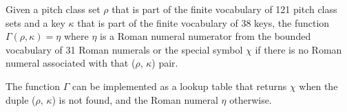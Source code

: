 
Given a pitch class set $\rho$ that is part of the finite
vocabulary of 121 pitch class sets and a key $\kappa$ that
is part of the finite vocabulary of 38 keys, the function
$\Gamma(\rho, \kappa) = \eta$ where $\eta$ is a Roman
numeral numerator from the bounded vocabulary of 31 Roman
numerals or the special symbol $\chi$ if there is no Roman
numeral associated with that ($\rho$, $\kappa$) pair.

The function $\Gamma$ can be implemented as a lookup table
that returns $\chi$ when the duple ($\rho$, $\kappa$) is not
found, and the Roman numeral $\eta$ otherwise.

